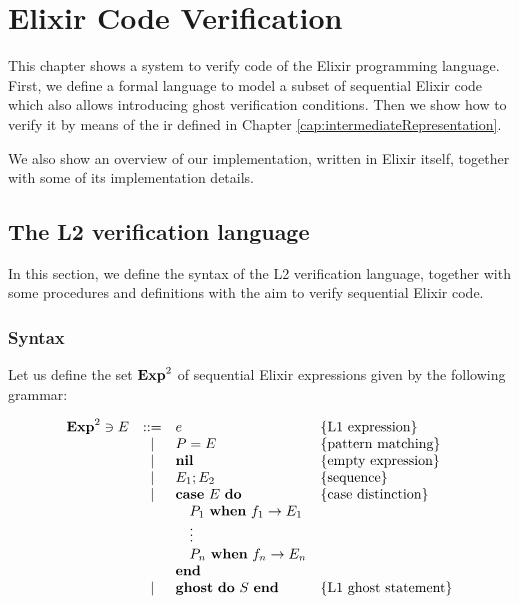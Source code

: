 \chapter{Elixir Code Verification}
\label{cap:elixirCodeVerification}


This chapter shows a system to verify code of the Elixir programming language.
First, we define a formal language to model a subset of sequential Elixir code
which also allows introducing ghost verification conditions. Then we show how to
verify it by means of the \gls{ir} defined in Chapter
\ref{cap:intermediateRepresentation}.

We also show an overview of our implementation, written in Elixir itself,
together with some of its implementation details.

\section{The L2 verification language}

In this section, we define the syntax of the L2 verification language, together
with some procedures and definitions with the aim to verify sequential Elixir
code.

\subsection{Syntax}

Let us define the set $\mathbf{Exp}^{2}$ of sequential Elixir expressions given by the 
following grammar:

\[
\begin{array}{rcll}
\mathbf{Exp}^{2} \ni E & ::= & e & \{ \textrm{L1 expression} \} \\
& | & P = E & \{ \textrm{pattern matching} \} \\
& | & \textbf{nil} & \{ \textrm{empty expression} \} \\
& | & E_1; E_2 & \{ \textrm{sequence} \} \\
& | & \textbf{case}~E~\textbf{do} & \{ \textrm{case distinction} \} \\
& & \quad P_1~\textbf{when}~f_1 \rightarrow E_1 \\
& & \quad \vdots\\
& & \quad P_n~\textbf{when}~f_n \rightarrow E_n \\
& & \textbf{end} \\
& | & \textbf{ghost}~\textbf{do}~S~\textbf{end} & \{ \textrm{L1 ghost statement} \} \\
\end{array}
\]


